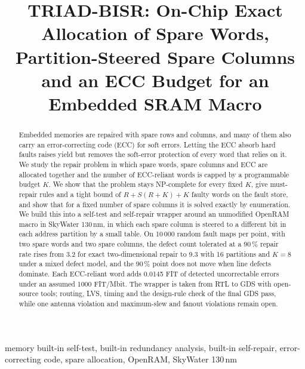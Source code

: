 \documentclass[conference]{IEEEtran}
\begin{document}
\title{TRIAD-BISR: On-Chip Exact Allocation of Spare Words, Partition-Steered Spare Columns and an ECC Budget for an Embedded SRAM Macro}

\author{
}

\maketitle

\begin{abstract}
Embedded memories are repaired with spare rows and columns, and many of them also carry an
error-correcting code (ECC) for soft errors. Letting the ECC absorb hard faults raises yield but
removes the soft-error protection of every word that relies on it. We study the repair problem in
which spare words, spare columns and ECC are allocated together and the number of ECC-reliant words is
capped by a programmable budget $K$. We show that the problem stays NP-complete for every fixed $K$,
give must-repair rules and a tight bound of $R+S(R+K)+K$ faulty words on the fault store, and show that
for a fixed number of spare columns it is solved exactly by enumeration. We build this into a
self-test and self-repair wrapper around an unmodified OpenRAM macro in SkyWater 130\,nm, in which each
spare column is steered to a different bit in each address partition by a small table. On 10\,000
random fault maps per point, with two spare words and two spare columns, the defect count tolerated at
a 90\,\% repair rate rises from 3.2 for exact two-dimensional repair to 9.3 with 16 partitions and
$K=8$ under a mixed defect model, and the 90\,\% point does not move when line defects dominate. Each ECC-reliant word
adds 0.0145 FIT of detected uncorrectable errors under an assumed 1000 FIT/Mbit. The wrapper is taken
from RTL to GDS with open-source tools; routing, LVS, timing and the design-rule check of the final GDS
pass, while one antenna violation and maximum-slew and fanout violations remain open.
\end{abstract}

\begin{IEEEkeywords}
memory built-in self-test, built-in redundancy analysis, built-in self-repair, error-correcting code,
spare allocation, OpenRAM, SkyWater 130\,nm
\end{IEEEkeywords}
\end{document}
